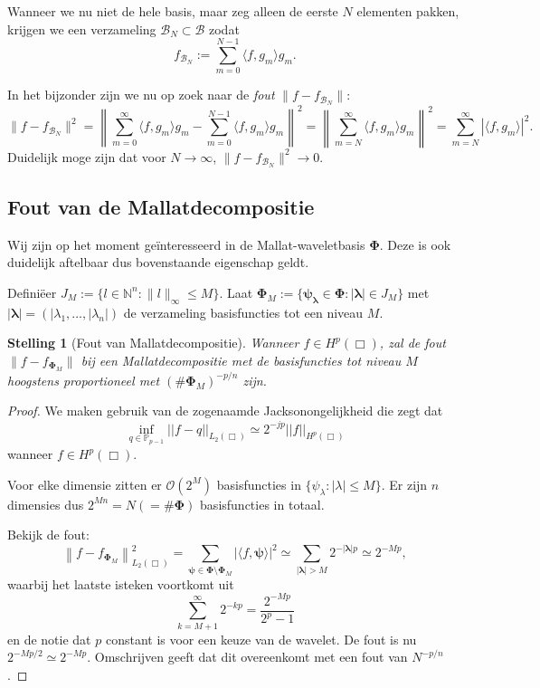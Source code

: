\documentclass[11pt]{report}
\theoremstyle{plain}
\newtheorem{stelling}{Stelling}
\theoremstyle{definition}
\theoremstyle{remark}
\newcommand{\N}{\mathbb{N}}
\begin{document}
Wanneer we nu niet de hele basis, maar zeg alleen de eerste $N$ elementen pakken, krijgen we een verzameling $\mathcal{B}_N \subset \mathcal{B}$ zodat
\[
	f_{\mathcal{B}_N} := \sum_{m = 0}^{N-1} \langle f, g_m \rangle g_m.
\]

In het bijzonder zijn we nu op zoek naar de \emph{fout} $\| f - f_{\mathcal{B}_N} \|$:
\[
	\| f - f_{\mathcal{B}_N} \|^2 = \left\| \sum_{m=0}^\infty\langle f, g_m \rangle g_m - \sum_{m=0}^{N-1}\langle f, g_m \rangle g_m \right\|^2 = \left\| \sum_{m=N}^\infty\langle f, g_m \rangle g_m \right\|^2 = \sum_{m=N}^\infty | \langle f, g_m \rangle |^2.
\]
Duidelijk moge zijn dat voor $N \to \infty$, $\| f - f_{\mathcal{B}_N} \|^2 \to 0$.

\subsection{Fout van de Mallatdecompositie}
Wij zijn op het moment ge\"interesseerd in de Mallat-waveletbasis $\boldsymbol\Phi$. Deze is ook duidelijk aftelbaar dus bovenstaande eigenschap geldt.

Defini\"eer $J_M := \{ l \in \N^n: \| l \|_\infty \leq M \}$. Laat $\boldsymbol\Phi_M := \{ \boldsymbol{\psi}_{\boldsymbol{\lambda}} \in \boldsymbol\Phi: |\boldsymbol\lambda| \in J_M \}$ met $|\boldsymbol\lambda| = (|\lambda_1, \ldots, |\lambda_n|)$ de verzameling basisfuncties tot een niveau $M$.

\begin{stelling}[Fout van Mallatdecompositie]
Wanneer $f \in H^p(\Box)$, zal de fout $\| f - f_{\mathcal{\boldsymbol\Phi}_M} \|$ bij een Mallatdecompositie met de basisfuncties tot niveau $M$ hoogstens proportioneel met $(\# \boldsymbol\Phi_M)^{-p/n}$ zijn.
\end{stelling}
\begin{proof}

We maken gebruik van de zogenaamde Jacksonongelijkheid \cite{jackson} die zegt dat 
\[
  \inf_{q \in \mathbb{P}_{p-1}} ||f - q||_{L_2(\Box)} \simeq 2^{-jp} ||f||_{H^p(\Box)}
\]
wanneer $f \in H^p(\Box)$.

Voor elke dimensie zitten er $\mathcal{O}(2^M)$ basisfuncties in $\{ \psi_\lambda: |\lambda| \leq M \}$. Er zijn $n$ dimensies dus $2^{Mn} = N (= \# \boldsymbol\Phi)$ basisfuncties in totaal.

Bekijk de fout:
\[
  \left\| f - f_{\boldsymbol\Phi_M} \right\|^2_{L_2(\Box)} = \sum_{{\boldsymbol\psi} \in \boldsymbol\Phi \setminus \boldsymbol\Phi_M} | \langle f, \boldsymbol\psi \rangle |^2 \simeq \sum_{|\boldsymbol\lambda| > M} 2^{-|\boldsymbol\lambda|p} \simeq 2^{-Mp},
\]
waarbij het laatste isteken voortkomt uit
\[
	\sum_{k=M+1}^\infty 2^{- kp} = \frac{2^{-Mp}}{2^p-1}
\]
en de notie dat $p$ constant is voor een keuze van de wavelet. De fout is nu $2^{-Mp/2} \simeq 2^{-Mp}$. Omschrijven geeft dat dit overeenkomt met een fout van $N^{-p/n}$.
\end{proof}
\end{document}

